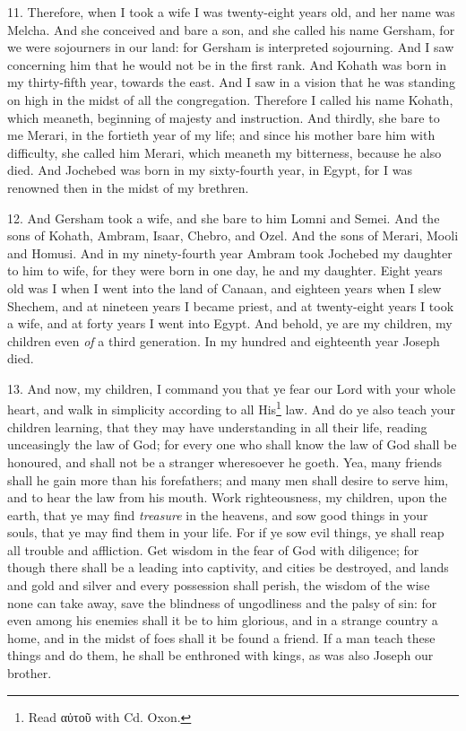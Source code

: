 11. Therefore, when I took a wife I was twenty-eight years old, and her name was Melcha. And she conceived and bare a son, and she called his name Gersham, for we were sojourners in our land: for Gersham is interpreted sojourning. And I saw concerning him that he would not be in the first rank. And Kohath was born in my thirty-fifth year, towards the east. And I saw in a vision that he was standing on high in the midst of all the congregation. Therefore I called his name Kohath, which meaneth, beginning of majesty and instruction. And thirdly, she bare to me Merari, in the fortieth year of my life; and since his mother bare him with difficulty, she called him Merari, which meaneth my bitterness, because he also died. And Jochebed was born in my sixty-fourth year, in Egypt, for I was renowned then in the midst of my brethren.

12. And Gersham took a wife, and she bare to him Lomni and Semei. And the sons of Kohath, Ambram, Isaar, Chebro, and Ozel. And the sons of Merari, Mooli and Homusi. And in my ninety-fourth year Ambram took Jochebed my daughter to him to wife, for they were born in one day, he and my daughter. Eight years old was I when I went into the land of Canaan, and eighteen years when I slew Shechem, and at nineteen years I became priest, and at twenty-eight years I took a wife, and at forty years I went into Egypt. And behold, ye are my children, my children even \emph{of} a third generation. In my hundred and eighteenth year Joseph died.

13. And now, my children, I command you that ye fear our Lord with your whole heart, and walk in simplicity according to all His\footnote{Read \textgreek{αὐτοῦ} with Cd. Oxon.} law. And do ye also teach your children learning, that they may have understanding in all their life, reading unceasingly the law of God; for every one who shall know the law of God shall be honoured, and shall not be a stranger wheresoever he goeth. Yea, many friends shall he gain more than his forefathers; and many men shall desire to serve him, and to hear the law from his mouth. Work righteousness, my children, upon the earth, that ye may find \emph{treasure} in the heavens, and sow good things in your souls, that ye may find them in your life. For if ye sow evil things, ye shall reap all trouble and affliction. Get wisdom in the fear of God with diligence; for though there shall be a leading into captivity, and cities be destroyed, and lands and gold and silver and every possession shall perish, the wisdom of the wise none can take away, save the blindness of ungodliness and the palsy of sin: for even among his enemies shall it be to him glorious, and in a strange country a home, and in the midst of foes shall it be found a friend. If a man teach these things and do them, he shall be enthroned with kings, as was also Joseph our brother.

